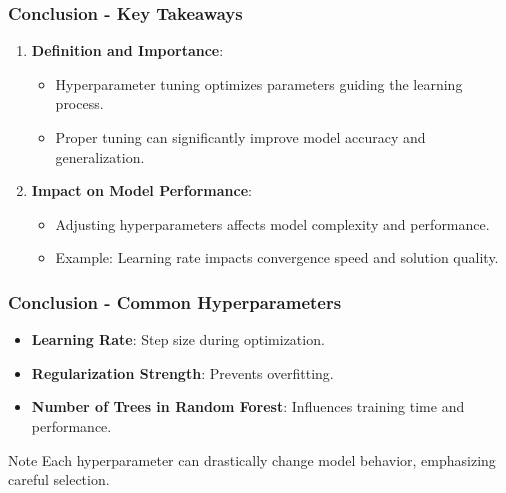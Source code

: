 \documentclass[aspectratio=169]{beamer}
\begin{document}
\begin{frame}[fragile]
    \frametitle{Conclusion - Key Takeaways}
    \begin{enumerate}
        \item \textbf{Definition and Importance}:
        \begin{itemize}
            \item Hyperparameter tuning optimizes parameters guiding the learning process.
            \item Proper tuning can significantly improve model accuracy and generalization.
        \end{itemize}
        
        \item \textbf{Impact on Model Performance}:
        \begin{itemize}
            \item Adjusting hyperparameters affects model complexity and performance.
            \item Example: Learning rate impacts convergence speed and solution quality.
        \end{itemize}
    \end{enumerate}
\end{frame}

\begin{frame}[fragile]
    \frametitle{Conclusion - Common Hyperparameters}
    \begin{itemize}
        \item \textbf{Learning Rate}: Step size during optimization.
        \item \textbf{Regularization Strength}: Prevents overfitting.
        \item \textbf{Number of Trees in Random Forest}: Influences training time and performance.
    \end{itemize}
    \begin{block}{Note}
    Each hyperparameter can drastically change model behavior, emphasizing careful selection.
    \end{block}
\end{frame}
\end{document}
